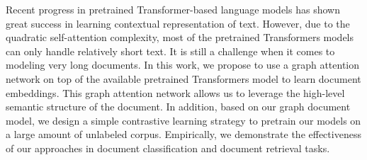 Recent progress in pretrained Transformer-based language models has shown great success in learning contextual representation of text. However, due to the quadratic self-attention complexity, most of the pretrained Transformers models can only handle relatively short text. It is still a challenge when it comes to modeling very long documents. In this work, we propose to use a graph attention network on top of the available pretrained Transformers model to learn document embeddings. This graph attention network allows us to leverage the high-level semantic structure of the document. In addition, based on our graph document model, we design a simple contrastive learning strategy to pretrain our models on a large amount of unlabeled corpus. Empirically, we demonstrate the effectiveness of our approaches in document classification and document retrieval tasks.
